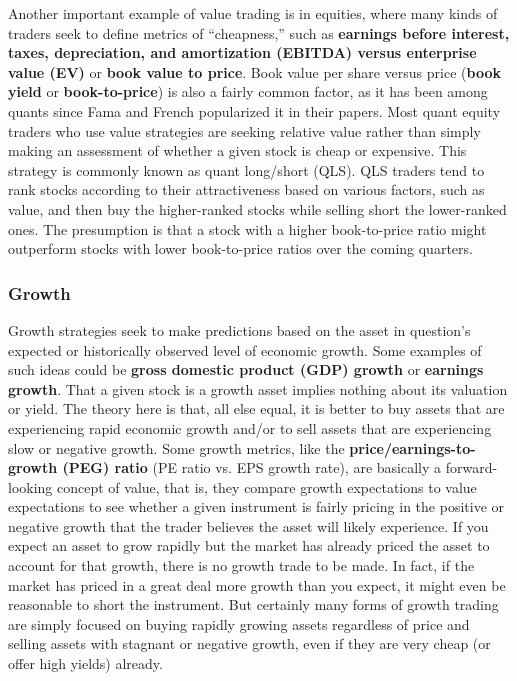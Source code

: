 \documentclass[11pt]{report}
\begin{document}
					Another important example of value trading is in equities, where many kinds of traders seek to define metrics of ``cheapness,'' such as \textbf{earnings before interest, taxes, depreciation, and amortization (EBITDA) versus enterprise value (EV)} or \textbf{book value to price}. Book value per share versus price (\textbf{book yield} or \textbf{book-to-price}) is also a fairly common factor, as it has been among quants since Fama and French popularized it in their papers. Most quant equity traders who use value strategies are seeking relative value rather than simply making an assessment of whether a given stock is cheap or expensive. This strategy is commonly known as quant long/short (QLS). QLS traders tend to rank stocks according to their attractiveness based on various factors, such as value, and then buy the higher-ranked stocks while selling short the lower-ranked ones. The presumption is that a stock with a higher book-to-price ratio might outperform stocks with lower book-to-price ratios over the coming quarters.

				\subsubsection{Growth}

					Growth strategies seek to make predictions based on the asset in question's expected or historically observed level of economic growth. Some examples of such ideas could be \textbf{gross domestic product (GDP) growth} or \textbf{earnings growth}. That a given stock is a growth asset implies nothing about its valuation or yield. The theory here is that, all else equal, it is better to buy assets that are experiencing rapid economic growth and/or to sell assets that are experiencing slow or negative growth. Some growth metrics, like the \textbf{price/earnings-to-growth (PEG) ratio} (PE ratio vs. EPS growth rate), are basically a forward-looking concept of value, that is, they compare growth expectations to value expectations to see whether a given instrument is fairly pricing in the positive or negative growth that the trader believes the asset will likely experience. If you expect an asset to grow rapidly but the market has already priced the asset to account for that growth, there is no growth trade to be made. In fact, if the market has priced in a great deal more growth than you expect, it might even be reasonable to short the instrument. But certainly many forms of growth trading are simply focused on buying rapidly growing assets regardless of price and selling assets with stagnant or negative growth, even if they are very cheap (or offer high yields) already.
\end{document}
